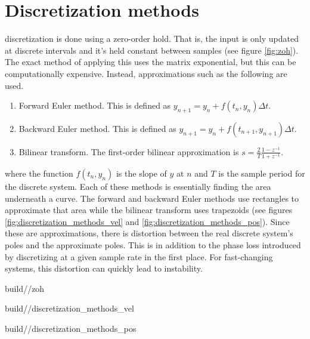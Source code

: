 \section{Discretization methods}

\Gls{discretization} is done using a zero-order hold. That is, the input is only
updated at discrete intervals and it's held constant between samples (see figure
\ref{fig:zoh}). The exact method of applying this uses the matrix exponential,
but this can be computationally expensive. Instead, approximations such as the
following are used.
\begin{enumerate}
  \item Forward Euler method. This is defined as
    $y_{n+1} = y_n + f(t_n, y_n) \Delta t$.
  \item Backward Euler method. This is defined as
    $y_{n+1} = y_n + f(t_{n+1}, y_{n+1}) \Delta t$.
  \item Bilinear transform. The first-order bilinear approximation is
    $s = \frac{2}{T} \frac{1 - z^{-1}}{1 + z^{-1}}$.
\end{enumerate}

where the function $f(t_n, y_n)$ is the slope of $y$ at $n$ and $T$ is the
sample period for the discrete \gls{system}. Each of these methods is
essentially finding the area underneath a curve. The forward and backward Euler
methods use rectangles to approximate that area while the bilinear transform
uses trapezoids (see figures \ref{fig:discretization_methods_vel} and
\ref{fig:discretization_methods_pos}). Since these are approximations, there is
distortion between the real discrete \gls{system}'s poles and the approximate
poles. This is in addition to the phase loss introduced by discretizing at a
given sample rate in the first place. For fast-changing \glspl{system}, this
distortion can quickly lead to instability.
\begin{bookfigure}
  \begin{minisvg}{2}{build/\chapterpath/zoh}
      \caption{Zero-order hold of a system response}
      \label{fig:zoh}
  \end{minisvg}
  \hfill
  \begin{minisvg}{2}{build/\chapterpath/discretization_methods_vel}
    \caption{Discretization methods applied to velocity data}
    \label{fig:discretization_methods_vel}
  \end{minisvg}
  \hfill
  \begin{minisvg}{2}{build/\chapterpath/discretization_methods_pos}
    \caption{Position plot of discretization methods applied to velocity data}
    \label{fig:discretization_methods_pos}
  \end{minisvg}
\end{bookfigure}

